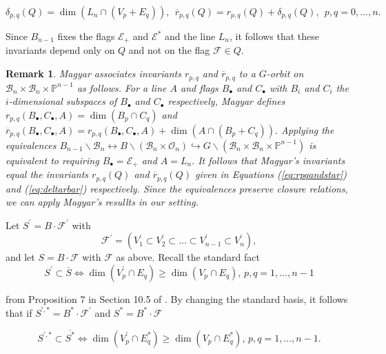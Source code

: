 \documentclass[12pt]{amsart}
\numberwithin{equation}{section}
\newtheorem{rem}[thm]{Remark}
\newcommand{\B}{\mathcal{B}}
\newcommand{\F}{\mathcal{F}}
\newcommand{\Borbitspace}{B_{n-1}\backslash\B_{n}}
\begin{document}
\begin{equation}\label{eq:deltarbar}
\delta_{p,q}(Q)=\dim(L_n \cap (V_p + E_q)), \ \ \overline{r}_{p,q}(Q)=r_{p,q}(Q) + \delta_{p,q}(Q), \ \ p,q=0, \dots, n.
\end{equation}

Since $B_{n-1}$ fixes the flags $\mathcal{E}_+$ and $\mathcal{E}^*$ and the line $L_n$, it follows that these invariants depend only on $Q$ and not on the flag 
$\F \in Q.$


\begin{rem}\label{r:connectionwithMag}
Magyar associates invariants $r_{p,q}$ and $\overline{r}_{p,q}$ to a $G$-orbit on 
$\B_{n}\times\B_{n}\times\mathbb{P}^{n-1}$ as follows. For a line $A$ and flags $B_{\bullet}$ and $C_{\bullet}$ with $B_i$ and $C_i$ the $i$-dimensional subspaces of $B_{\bullet}$ and $C_{\bullet}$ respectively, Magyar defines $r_{p,q}(B_{\bullet},C_{\bullet},A)=\dim(B_p \cap C_q)$ and ${\overline{r}}_{p,q}(B_{\bullet},C_{\bullet},A)=r_{p,q}(B_{\bullet},C_{\bullet},A) + \dim(A \cap (B_p + C_q)).$  Applying the equivalences $ \Borbitspace\leftrightarrow B\backslash(\B_{n}\times\mathcal{O}_{n}) \hookrightarrow G\backslash (\B_{n}\times\B_{n}\times\mathbb{P}^{n-1})$ is equivalent to requiring $B_{\bullet} = \mathcal{E}_+$ and $A=L_n.$  It follows that Magyar's invariants equal the invariants $r_{p,q}(Q)$ and $\overline{r}_{p,q}(Q)$ given in Equations (\ref{eq:rpqandstar}) and (\ref{eq:deltarbar}) respectively.  Since the equivalences preserve closure relations, we can apply Magyar's resullts in our setting.
\end{rem}


Let $S^{\prime}=B\cdot \F^{\prime}$ with
$$\mathcal{F}^{\prime}=(V_{1}^{\prime}\subset V_{2}^{\prime}\subset\dots\subset V_{n-1}^{\prime}\subset V_{n}^{\prime}),
   $$
and let $S=B\cdot \F$ with $\F$ as above.  Recall the standard fact
\begin{equation}\label{eq:standardbruhatorder}
S^{\prime} \subset \overline{S} \iff \dim(V_p^{\prime} \cap E_q) \ge \dim(V_p \cap E_q), \,p, q = 1, \dots, n-1
\end{equation}

\noindent from  Proposition 7 in Section 10.5 of \cite{Fulton}.  By changing the standard basis, it follows that if $S^{\prime, *}=B^* \cdot \F^{\prime}$ and $S^*=B^*\cdot \F$

\begin{equation}\label{eq:starstandard}
S^{\prime, *} \subset \overline{S^*} \iff \dim(V_p^{\prime} \cap E_q^*) \ge \dim(V_p \cap E_q^*),\, p, q = 1, \dots, n-1.
\end{equation}
\end{document}

